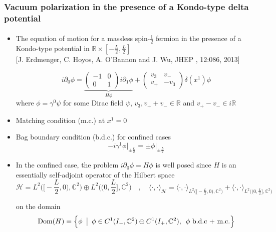 \documentclass[english]{beamer}
\begin{document}
\begin{frame}[shrink=30]
\frametitle{\small{Vacuum polarization in the presence of a Kondo-type delta potential}}
\framesubtitle{}
\begin{itemize}
%
\item<1-> 
The equation of motion for a massless spin-$\frac 1 2$ fermion in the presence of a Kondo-type potential in $\mathbb{R}\times[-\frac L 2 , \frac{L}{2}]$\\
\tiny\color{blue}[J. Erdmenger, C. Hoyos, A. O'Bannon and J. Wu, JHEP
, 12:086, 2013]\color{black}\normalsize

\begin{equation*}
i \partial_0 \phi = 
\underbrace{\begin{pmatrix} 
-1 & 0 \\
0 & 1 
\end{pmatrix} i \partial_1 \phi }_{H\phi}+
\begin{pmatrix}
v_3 & v_- \\
v_+ & -v_3
\end{pmatrix} \delta(x^1) \phi
\end{equation*}
where $\phi = \gamma^0\psi$ for some Dirac field $\psi$,  $v_3, v_+ + v_- \in \mathbb{R}$ and $ v_+ - v_-\in i \mathbb{R}$
%
\item<2-> Matching condition (m.c.) at $x^1 = 0$ 
%
\item<3-> Bag boundary condition (b.d.c.) for confined cases 
\begin{equation*}
- i\gamma^1 \phi \Big\vert_{\pm \frac{L}{2}} = \pm \phi \Big\vert_{\pm \frac{L}{2}}
\end{equation*}

%
\item<4-> In the confined case, the problem $i\partial_0\phi = H\phi$ is well posed since $H$ is an essentially self-adjoint operator of the Hilbert space
\begin{equation*}
\mathcal{H} = L^{2}\Big(\big[-\frac L 2, 0\big), \mathbb{C}^2\Big) \oplus L^{2}\Big(\big(0,\frac L 2\big], \mathbb{C}^2\Big) 
\quad,\quad
\langle \cdot, \cdot\rangle_{\mathcal{H} } = \langle \cdot, \cdot\rangle_{L^{2}\big(\big[-\frac L 2, 0\big), \mathbb{C}^2\big)} +\langle \cdot, \cdot\rangle_{L^{2}\big(\big(0,\frac L 2\big], \mathbb{C}^2\big)}
\end{equation*}

 on the domain
\begin{equation*}
\mathrm{Dom}(H) = \Big \{\phi \enskip \big\vert \enskip \phi \in C^{1}(I_-, \mathbb{C}^2) \oplus C^{1}(I_+, \mathbb{C}^2), \enskip \phi \textrm{ b.d.c + m.c.} \Big \}
\end{equation*} 


\end{itemize}
\end{frame}
\end{document}
